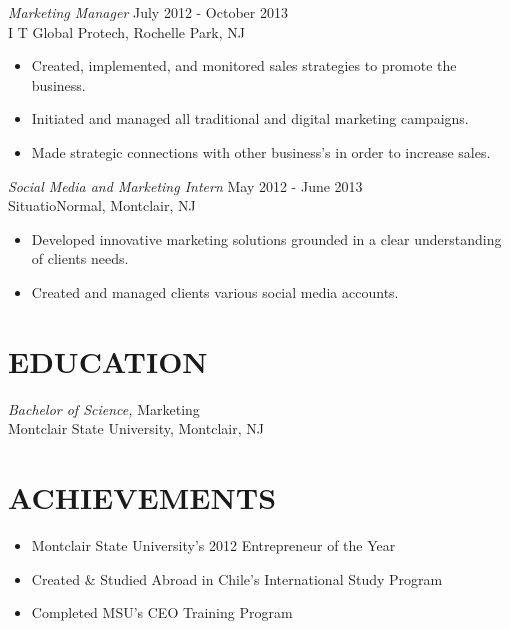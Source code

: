 \documentclass[margin]{res}
\begin{document}
\begin{resume}
                {\sl Marketing Manager} \hfill July 2012 - October 2013 \\
                I T Global Protech, Rochelle Park, NJ
                 \begin{itemize}  \itemsep -2pt %
                 \item Created, implemented, and monitored sales strategies to promote the business.
                 \item Initiated and managed all traditional and digital marketing campaigns.
                 \item Made strategic connections with other business's in order to increase sales.
                 \end{itemize}
                 
               {\sl Social Media and Marketing Intern} \hfill            May 2012 - June 2013 \\
                SituatioNormal, Montclair, NJ
                 \begin{itemize}  \itemsep -2pt %
                 \item Developed innovative marketing solutions grounded in a clear understanding of clients needs.
                 \item Created and managed clients various social media accounts.
                 \end{itemize} 
 
\section{EDUCATION} {\sl Bachelor of Science,} Marketing \\
                Montclair State University, Montclair, NJ \vspace{0.1pt}
\section{ACHIEVEMENTS}
\begin{itemize} 
		\item Montclair State University's 2012 Entrepreneur of the Year
		\item Created \& Studied Abroad in Chile's International Study Program
		\item Completed MSU's CEO Training Program 
					                
					                 
\end{itemize}

\end{resume}
\end{document}
